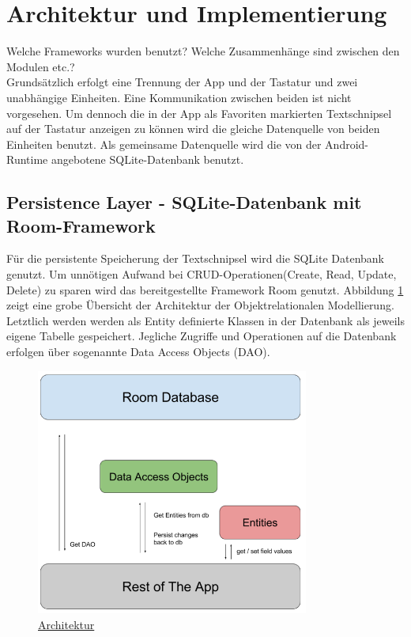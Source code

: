 \documentclass[11pt]{article}
\begin{document}
	
\section{Architektur und Implementierung}
	Welche Frameworks wurden benutzt? Welche Zusammenhänge sind zwischen den Modulen etc.?\\
	Grundsätzlich erfolgt eine Trennung der App und der Tastatur und zwei unabhängige Einheiten.
	Eine Kommunikation zwischen beiden ist nicht vorgesehen.
	Um dennoch die in der App als Favoriten markierten Textschnipsel auf der Tastatur anzeigen zu können wird die gleiche Datenquelle von beiden Einheiten benutzt.
	Als gemeinsame Datenquelle wird die von der Android-Runtime angebotene SQLite-Datenbank benutzt.
		
		\subsection{Persistence Layer - SQLite-Datenbank mit Room-Framework}
			Für die persistente Speicherung der Textschnipsel wird die SQLite Datenbank genutzt. 
			Um unnötigen Aufwand bei CRUD-Operationen(Create, Read, Update, Delete) zu sparen wird das  bereitgestellte Framework Room genutzt. \newline
			Abbildung \ref{fig:room_arch} zeigt eine grobe Übersicht der Architektur der Objektrelationalen Modellierung. Letztlich werden werden als Entity definierte Klassen in der Datenbank als jeweils eigene Tabelle gespeichert. Jegliche Zugriffe und Operationen auf die Datenbank erfolgen über sogenannte Data Access Objects (DAO). 
						
			\begin{figure}[H]
				\centering
				\includegraphics[width=0.8\textwidth]{Konzepte/room_architecture.png}
				\caption{\href{https://developer.android.com/training/data-storage/room/}{Architektur}}
				\label{fig:room_arch}
			\end{figure}
		
\end{document}
